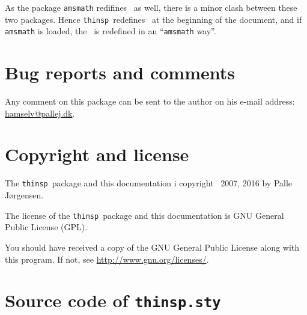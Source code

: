 \documentclass[a4paper,11pt,british]{article}
\def\thinsp{\texttt{thinsp}}
\def\strthinspace{\texttt{\string\thinspace}}
\begin{document}
As the package \texttt{amsmath} redifines \strthinspace\ as well,
there is a minor clash between these two packages. Hence \thinsp\
redefines \strthinspace\ at the beginning of the document, and if
\texttt{amsmath} is loaded, the \strthinspace\ is redefined in an
``\texttt{amsmath} way''.

\section{Bug reports and comments}
\label{sec:bug-reports-comments}

Any comment on this package can be sent to the author on his e-mail
address: \url{hamselv@pallej.dk}.

\section{Copyright and license}
\label{sec:copyright-license}

The \thinsp\ package and this documentation i copyright
\textcopyright\ 2007, 2016 by Palle J\o rgensen.

The license of the \thinsp\ package and this documentation is GNU
General Public License (GPL).

You should have received a copy of the GNU General Public License
along with this program. If not, see \url{http://www.gnu.org/licenses/}.

\appendix
\clearpage

\section{Source code of \texttt{thinsp.sty}}
\label{sec:source-code-thinsp.s}


\end{document}
